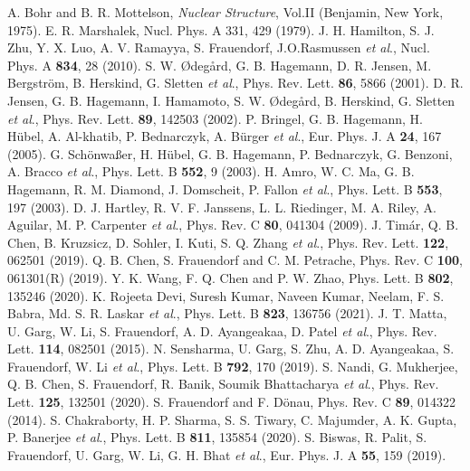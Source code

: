 \documentclass[aps,prc,preprint,showpacs,groupedaddress,floatfix,amsmath,amssymb]{revtex4-1}
\begin{document}
\begin{thebibliography}{100}
A. Bohr and B. R. Mottelson, \textit{Nuclear Structure}, Vol.II (Benjamin, New York, 1975).
  E. R. Marshalek, Nucl. Phys. A 331, 429 (1979).
J. H. Hamilton, S. J. Zhu, Y. X. Luo, A. V. Ramayya, S. Frauendorf, J.O.Rasmussen \textit{et al}., Nucl. Phys. A {\bf{834}}, 28 (2010).
S. W. {\O}deg{\aa}rd, G. B. Hagemann, D. R. Jensen, M. Bergstr\"{o}m, B. Herskind, G. Sletten \textit{et al}., Phys. Rev. Lett. {\bf{86}}, 5866 (2001).
D. R. Jensen, G. B. Hagemann, I. Hamamoto, S. W. {\O}deg{\aa}rd, B. Herskind, G. Sletten \textit{et al}., Phys. Rev. Lett. {\bf{89}}, 142503 (2002).
P. Bringel, G. B. Hagemann, H. H\"{u}bel, A. Al-khatib, P. Bednarczyk, A. B\"{u}rger \textit{et al}., Eur. Phys. J. A {\bf{24}}, 167 (2005).
G. Sch\"{o}nwa{\ss}er, H. H\"{u}bel, G. B. Hagemann, P. Bednarczyk,  G. Benzoni, A. Bracco \textit{et al}., Phys. Lett. B {\bf{552}}, 9 (2003).
H. Amro, W. C. Ma, G. B. Hagemann, R. M. Diamond, J. Domscheit, P. Fallon \textit{et al}., Phys. Lett. B {\bf{553}}, 197 (2003).
D. J. Hartley, R. V. F. Janssens, L. L. Riedinger, M. A. Riley, A. Aguilar, M. P. Carpenter \textit{et al}., Phys. Rev. C {\bf{80}}, 041304 (2009).
J. Tim\'{a}r, Q. B. Chen, B. Kruzsicz, D. Sohler, I. Kuti, S. Q. Zhang \textit{et al}., Phys. Rev. Lett. {\bf{122}}, 062501 (2019).
Q. B. Chen, S. Frauendorf and C. M. Petrache, Phys. Rev. C {\bf{100}}, 061301(R) (2019).
Y. K. Wang, F. Q. Chen and P. W. Zhao, Phys. Lett. B {\bf{802}}, 135246 (2020).
 K. Rojeeta Devi, Suresh Kumar, Naveen Kumar, Neelam, F. S. Babra, Md. S. R. Laskar \textit{et al}., Phys. Lett. B {\bf{823}}, 136756 (2021).
J. T. Matta, U. Garg, W. Li, S. Frauendorf, A. D. Ayangeakaa, D. Patel \textit{et al}., Phys. Rev. Lett. {\bf{114}}, 082501 (2015).
N. Sensharma, U. Garg, S. Zhu, A. D. Ayangeakaa, S. Frauendorf, W. Li \textit{et al}., Phys. Lett. B  {\bf{792}}, 170 (2019).
S. Nandi, G. Mukherjee, Q. B. Chen, S. Frauendorf, R. Banik, Soumik Bhattacharya \textit{et al}., Phys. Rev. Lett. {\bf{125}}, 132501 (2020).
S. Frauendorf and F. D\"{o}nau, Phys. Rev. C {\bf{89}}, 014322 (2014).
S. Chakraborty, H. P. Sharma, S. S. Tiwary, C. Majumder, A. K. Gupta, P. Banerjee \textit{et al}., Phys. Lett. B {\bf{811}}, 135854 (2020).
S. Biswas, R. Palit, S. Frauendorf, U. Garg, W. Li, G. H. Bhat \textit{et al}., Eur. Phys. J. A {\bf{55}}, 159 (2019).

\end{thebibliography}
\end{document}
